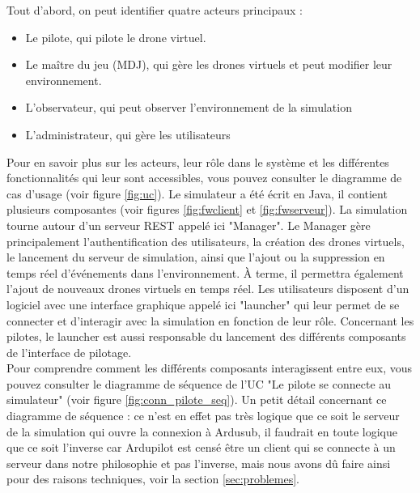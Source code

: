 \documentclass{scrartcl}
\begin{document}
Tout d'abord, on peut identifier quatre acteurs principaux :
\begin{itemize}
    \item Le pilote, qui pilote le drone virtuel.
    \item Le maître du jeu (MDJ), qui gère les drones virtuels et peut modifier leur environnement.
    \item L'observateur, qui peut observer l'environnement de la simulation
    \item L'administrateur, qui gère les utilisateurs
\end{itemize}

Pour en savoir plus sur les acteurs, leur rôle dans le système et les différentes fonctionnalités qui leur sont accessibles, vous pouvez consulter le diagramme de cas d'usage (voir figure \ref{fig:uc}).
Le simulateur a été écrit en Java, il contient plusieurs composantes (voir figures \ref{fig:fwclient} et \ref{fig:fwserveur}).
La simulation tourne autour d'un serveur REST appelé ici "Manager".
Le Manager gère principalement l’authentification des utilisateurs, la création des drones virtuels, le lancement du serveur de simulation,
ainsi que l’ajout ou la suppression en temps réel d’événements dans l’environnement. À terme, il permettra également l’ajout de nouveaux drones virtuels en temps réel.
Les utilisateurs disposent d'un logiciel avec une interface graphique appelé ici "launcher" qui leur permet de se connecter et d'interagir avec la simulation
en fonction de leur rôle. Concernant les pilotes, le launcher est aussi responsable du lancement des différents composants de l'interface de pilotage.
\\
Pour comprendre comment les différents composants interagissent entre eux, vous pouvez consulter le diagramme de séquence
de l'UC "Le pilote se connecte au simulateur" (voir figure \ref{fig:conn_pilote_seq}).
Un petit détail concernant ce diagramme de séquence : ce n'est en effet pas très logique que ce soit le serveur de la simulation qui ouvre la connexion à Ardusub, il faudrait en toute logique
que ce soit l'inverse car Ardupilot est censé être un client qui se connecte à un serveur dans notre philosophie et pas l'inverse, mais
nous avons dû faire ainsi pour des raisons techniques, voir la section \ref{sec:problemes}.\\
\end{document}
